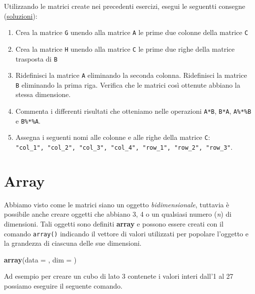 \documentclass[
]{book}
\newenvironment{Shaded}{\begin{snugshade}}{\end{snugshade}}
\newcommand{\DataTypeTok}[1]{\textcolor[rgb]{0.13,0.29,0.53}{#1}}
\newcommand{\KeywordTok}[1]{\textcolor[rgb]{0.13,0.29,0.53}{\textbf{#1}}}
\newcommand{\NormalTok}[1]{#1}
\providecommand{\tightlist}{%
  \setlength{\itemsep}{0pt}\setlength{\parskip}{0pt}}
\begin{document}
Utilizzando le matrici create nei precedenti esercizi, esegui le seguentti consegne (\href{https://github.com/psicostat/Introduction2R/blob/master/exercises/chapter-09-matrices.R}{soluzioni}):

\begin{enumerate}
\def\labelenumi{\arabic{enumi}.}
\tightlist
\item
  Crea la matrice \texttt{G} unendo alla matrice \texttt{A} le prime due colonne della matrice \texttt{C}
\item
  Crea la matrice \texttt{H} unendo alla matrice \texttt{C} le prime due righe della matrice trasposta di \texttt{B}
\item
  Ridefinisci la matrice \texttt{A} eliminando la seconda colonna. Ridefinisci la matrice \texttt{B} eliminando la prima riga. Verifica che le matrici così ottenute abbiano la stessa dimensione.
\item
  Commenta i differenti risultati che otteniamo nelle operazioni \texttt{A*B}, \texttt{B*A}, \texttt{A\%*\%B} e \texttt{B\%*\%A}.
\item
  Assegna i seguenti nomi alle colonne e alle righe della matrice \texttt{C}: \texttt{"col\_1",\ "col\_2",\ "col\_3",\ "col\_4",\ "row\_1",\ "row\_2",\ "row\_3"}.
\end{enumerate}

\hypertarget{array}{%
\section{Array}\label{array}}

Abbiamo visto come le matrici siano un oggetto \emph{bidimensionale}, tuttavia è possibile anche creare oggetti che abbiano 3, 4 o un qualsiasi numero (\emph{n}) di dimensioni. Tali oggetti sono definiti \textbf{array} e possono essere creati con il comando \texttt{array()} indicando il vettore di valori utilizzati per popolare l'oggetto e la grandezza di ciascuna delle sue dimensioni.

\begin{Shaded}
\begin{Highlighting}[]
\KeywordTok{array}\NormalTok{(}\DataTypeTok{data =}\NormalTok{ , }\DataTypeTok{dim =}\NormalTok{ )}
\end{Highlighting}
\end{Shaded}

Ad esempio per creare un cubo di lato 3 contenete i valori interi dall'1 al 27 possiamo eseguire il seguente comando.
\end{document}
